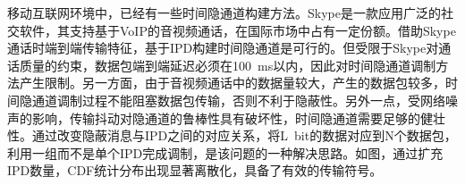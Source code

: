 
移动互联网环境中，已经有一些时间隐通道构建方法。Skype是一款应用广泛的社交软件，其支持基于VoIP的音视频通话，在国际市场中占有一定份额。借助Skype通话时端到端传输特征，基于IPD构建时间隐通道是可行的。但受限于Skype对通话质量的约束，数据包端到端延迟必须在{100\ ms}以内，因此对时间隐通道调制方法产生限制。另一方面，由于音视频通话中的数据量较大，产生的数据包较多，时间隐通道调制过程不能阻塞数据包传输，否则不利于隐蔽性。另外一点，受网络噪声的影响，传输抖动对隐通道的鲁棒性具有破坏性，时间隐通道需要足够的健壮性。通过改变隐蔽消息与IPD之间的对应关系，将{L\ bit}的数据对应到N个数据包，利用一组而不是单个IPD完成调制，是该问题的一种解决思路。如图，通过扩充IPD数量，CDF统计分布出现显著离散化，具备了有效的传输符号。


